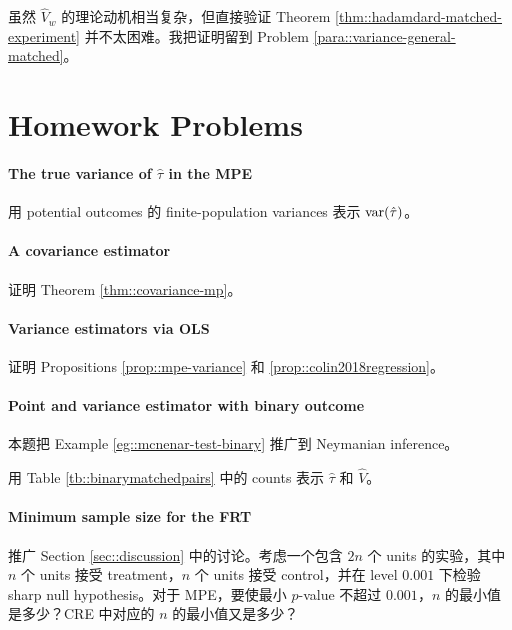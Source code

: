 虽然 $\hat{V}_w $ 的理论动机相当复杂，但直接验证 Theorem \ref{thm::hadamdard-matched-experiment} 并不太困难。我把证明留到 Problem \ref{para::variance-general-matched}。
 



\section{Homework Problems}

\paragraph{The true variance of $\hat{\tau}$ in the MPE}
\label{para::variance-mp-design}

用 potential outcomes 的 finite-population variances 表示 $\textup{var}(\hat{\tau})$。

\paragraph{A covariance estimator}\label{para::covariance-est-proof}
证明 Theorem \ref{thm::covariance-mp}。

\paragraph{Variance estimators via OLS}\label{para::seols-matchedpairs}
证明 Propositions \ref{prop::mpe-variance} 和 \ref{prop::colin2018regression}。


\paragraph{Point and variance estimator with binary outcome}\label{para::binary-matchedpairs-neyman}


本题把 Example \ref{eg::mcnenar-test-binary} 推广到 Neymanian inference。

用 Table \ref{tb::binarymatchedpairs} 中的 counts 表示 $\hat\tau$ 和 $\hat V$。




\paragraph{Minimum sample size for the FRT}
\label{prob::minimum-n-0.001}

推广 Section \ref{sec::discussion} 中的讨论。考虑一个包含 $2n$ 个 units 的实验，其中 $n$ 个 units 接受 treatment，$n$ 个 units 接受 control，并在 level $0.001$ 下检验 sharp null hypothesis。对于 MPE，要使最小 $p$-value 不超过 $0.001$，$n$ 的最小值是多少？CRE 中对应的 $n$ 的最小值又是多少？
 

